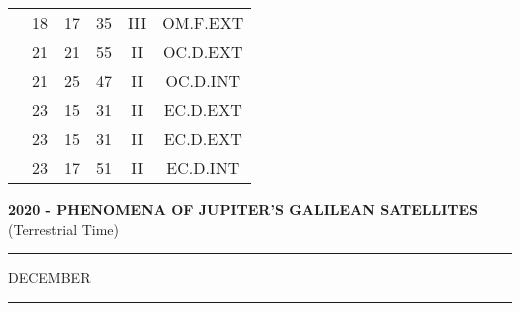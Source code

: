 \documentclass[12pt, a4paper]{article}
\begin{document}
\begin{multicols}{3}
{\begin{tabular}{c c c c c c}
	 	 	 	 & 18 & 17 & 35 & III & OM.F.EXT\\%
	 	 	 	 & 21 & 21 & 55 & II & OC.D.EXT\\%
	 	 	 	 & 21 & 25 & 47 & II & OC.D.INT\\%
	 	 	 	 & 23 & 15 & 31 & II & EC.D.EXT\\%
	 	 	 	 & 23 & 15 & 31 & II & EC.D.EXT\\%
	 	 	 	 & 23 & 17 & 51 & II & EC.D.INT\\%
	 	 \end{tabular}
 	}
\end{multicols}
\textbf{2020 - PHENOMENA OF JUPITER'S GALILEAN SATELLITES}\\(Terrestrial Time) 
\vspace{0.1cm} \hrule \vspace{0.1cm}
DECEMBER\vspace{0.1cm}
\hrule
\vspace{-0.2cm}
\end{document}
